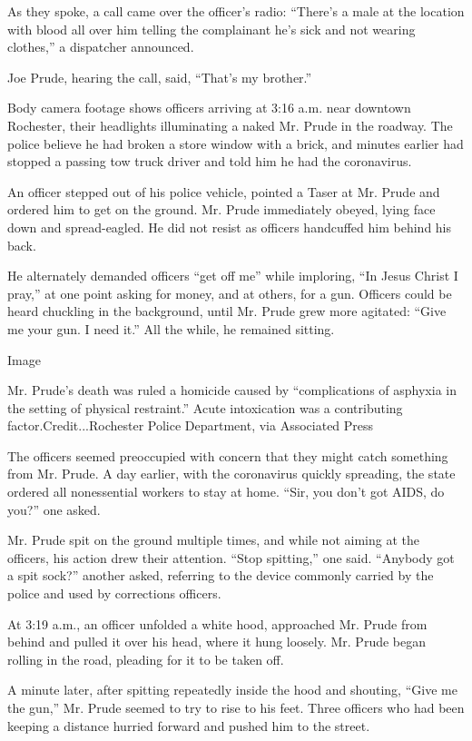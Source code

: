 As they spoke, a call came over the officer's radio: ``There's a male at
the location with blood all over him telling the complainant he's sick
and not wearing clothes,'' a dispatcher announced.

Joe Prude, hearing the call, said, ``That's my brother.''

Body camera footage shows officers arriving at 3:16 a.m. near downtown
Rochester, their headlights illuminating a naked Mr. Prude in the
roadway. The police believe he had broken a store window with a brick,
and minutes earlier had stopped a passing tow truck driver and told him
he had the coronavirus.

An officer stepped out of his police vehicle, pointed a Taser at Mr.
Prude and ordered him to get on the ground. Mr. Prude immediately
obeyed, lying face down and spread-eagled. He did not resist as officers
handcuffed him behind his back.

He alternately demanded officers ``get off me'' while imploring, ``In
Jesus Christ I pray,'' at one point asking for money, and at others, for
a gun. Officers could be heard chuckling in the background, until Mr.
Prude grew more agitated: ``Give me your gun. I need it.'' All the
while, he remained sitting.

Image

Mr. Prude's death was ruled a homicide caused by ``complications of
asphyxia in the setting of physical restraint.'' Acute intoxication was
a contributing factor.Credit...Rochester Police Department, via
Associated Press

The officers seemed preoccupied with concern that they might catch
something from Mr. Prude. A day earlier, with the coronavirus quickly
spreading, the state ordered all nonessential workers to stay at home.
``Sir, you don't got AIDS, do you?'' one asked.

Mr. Prude spit on the ground multiple times, and while not aiming at the
officers, his action drew their attention. ``Stop spitting,'' one said.
``Anybody got a spit sock?'' another asked, referring to the device
commonly carried by the police and used by corrections officers.

At 3:19 a.m., an officer unfolded a white hood, approached Mr. Prude
from behind and pulled it over his head, where it hung loosely. Mr.
Prude began rolling in the road, pleading for it to be taken off.

A minute later, after spitting repeatedly inside the hood and shouting,
``Give me the gun,'' Mr. Prude seemed to try to rise to his feet. Three
officers who had been keeping a distance hurried forward and pushed him
to the street.

